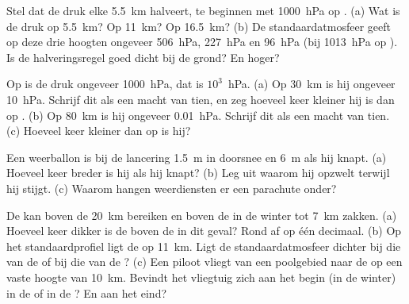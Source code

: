 \begin{exercise}[$\star\star$]\label{exo:g8:the-atmosphere:7}
Stel dat de druk elke \qty{5.5}{km} halveert, te beginnen met
\qty{1000}{hPa} op . (a) Wat is de druk op \qty{5.5}{km}? Op
\qty{11}{km}? Op \qty{16.5}{km}? (b) De standaardatmosfeer geeft op deze
drie hoogten ongeveer \qty{506}{hPa}, \qty{227}{hPa} en \qty{96}{hPa} (bij
\qty{1013}{hPa} op ). Is de halveringsregel goed dicht bij de
grond? En hoger?
\end{exercise}

\begin{exercise}[$\star\star$]\label{exo:g8:the-atmosphere:8}
Op  is de druk ongeveer \qty{1000}{hPa}, dat is $10^3$~hPa. (a) Op
\qty{30}{km} is hij ongeveer \qty{10}{hPa}. Schrijf dit als een macht van
tien, en zeg hoeveel keer kleiner hij is dan op . (b) Op
\qty{80}{km} is hij ongeveer \qty{0.01}{hPa}. Schrijf dit als een macht van
tien. (c) Hoeveel keer kleiner dan op  is hij?
\end{exercise}

\begin{exercise}[$\star\star$]\label{exo:g8:the-atmosphere:9}
Een weerballon is bij de lancering \qty{1.5}{m} in doorsnee en
\qty{6}{m} als hij knapt. (a) Hoeveel keer breder is hij als hij knapt?
(b) Leg uit waarom hij opzwelt terwijl hij stijgt. (c) Waarom hangen
weerdiensten er een parachute onder?
\end{exercise}

\begin{exercise}[$\star\star$]\label{exo:g8:the-atmosphere:10}
De  kan boven de  \qty{20}{km} bereiken en boven de 
in de winter tot \qty{7}{km} zakken. (a) Hoeveel keer dikker is de
 boven de  in dit geval? Rond af op één decimaal. (b) Op
het standaardprofiel ligt de  op \qty{11}{km}. Ligt de
standaardatmosfeer dichter bij die van de  of bij die van de ?
(c) Een piloot vliegt van een poolgebied naar de  op een vaste
hoogte van \qty{10}{km}. Bevindt het vliegtuig zich aan het begin (in de
winter) in de  of in de ? En aan het eind?
\end{exercise}

